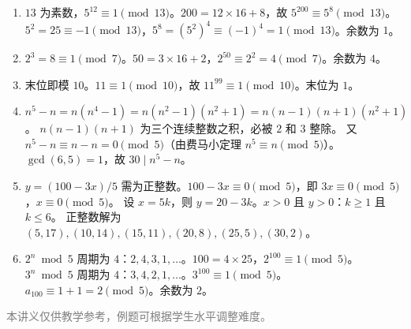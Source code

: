 \documentclass[12pt, a4paper]{ctexart}
\begin{document}
\begin{knowledgebox}[参考答案]
\begin{enumerate}
  \item $13$ 为素数，$5^{12} \equiv 1 \pmod{13}$。$200 = 12 \times 16 + 8$，故 $5^{200} \equiv 5^8 \pmod{13}$。
  $5^2 = 25 \equiv -1 \pmod{13}$，$5^8 = (5^2)^4 \equiv (-1)^4 = 1 \pmod{13}$。余数为 $\boxed{1}$。

  \item $2^3 = 8 \equiv 1 \pmod{7}$。$50 = 3 \times 16 + 2$，$2^{50} \equiv 2^2 = 4 \pmod{7}$。余数为 $\boxed{4}$。

  \item 末位即模 $10$。$11 \equiv 1 \pmod{10}$，故 $11^{99} \equiv 1 \pmod{10}$。末位为 $\boxed{1}$。

  \item $n^5 - n = n(n^4-1) = n(n^2-1)(n^2+1) = n(n-1)(n+1)(n^2+1)$。
  $n(n-1)(n+1)$ 为三个连续整数之积，必被 $2$ 和 $3$ 整除。
  又 $n^5 - n \equiv n - n = 0 \pmod{5}$（由费马小定理 $n^5 \equiv n \pmod{5}$）。
  $\gcd(6, 5) = 1$，故 $30 \mid n^5 - n$。

  \item $y = (100 - 3x)/5$ 需为正整数。$100 - 3x \equiv 0 \pmod{5}$，即 $3x \equiv 0 \pmod{5}$，$x \equiv 0 \pmod{5}$。
  设 $x = 5k$，则 $y = 20 - 3k$。$x > 0$ 且 $y > 0$：$k \ge 1$ 且 $k \le 6$。
  正整数解为 $(5, 17), (10, 14), (15, 11), (20, 8), (25, 5), (30, 2)$。

  \item $2^n \bmod 5$ 周期为 $4$：$2, 4, 3, 1, \ldots$。$100 = 4 \times 25$，$2^{100} \equiv 1 \pmod{5}$。
  $3^n \bmod 5$ 周期为 $4$：$3, 4, 2, 1, \ldots$。$3^{100} \equiv 1 \pmod{5}$。
  $a_{100} \equiv 1 + 1 = 2 \pmod{5}$。余数为 $\boxed{2}$。
\end{enumerate}
\end{knowledgebox}

\vfill
\begin{center}
\small\textcolor{gray}{本讲义仅供教学参考，例题可根据学生水平调整难度。}
\end{center}
\end{document}

